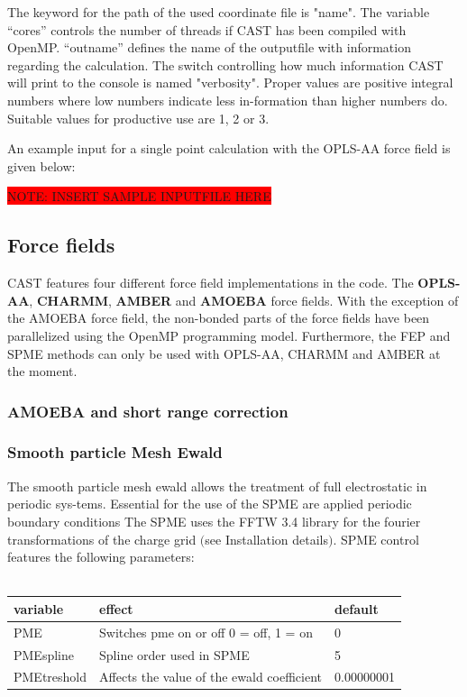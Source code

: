 \documentclass[10pt,a4paper]{article} %
\newif\ifdevmode %
\begin{document}
{	The keyword for the path of the used coordinate file is "name". The variable “cores” controls the number of threads if CAST has been compiled with OpenMP\supercite{openmp08}. “outname” defines the name of the outputfile with information regarding the calculation.
	The switch controlling how much information CAST will print to the console is named "verbosity". Proper values are positive integral numbers where low numbers indicate less in-formation than higher numbers do. Suitable values for productive use are 1, 2 or 3.



	 An example input for a single point calculation with the OPLS-AA force field is given below:

	\colorbox{red}{NOTE: INSERT SAMPLE INPUTFILE HERE}


	\subsection{Force fields}
	CAST features four different force field implementations in the code. The \textbf{OPLS-AA}\supercite{oplsaa, oplsaa2}, \textbf{CHARMM}\supercite{charmm}, \textbf{AMBER}\supercite{amber} and \textbf{AMOEBA}\supercite{amoeba} force fields. With the exception of the AMOEBA force field, the non-bonded parts of the force fields have been parallelized using the OpenMP programming model. Furthermore, the FEP and SPME methods can only be used with OPLS-AA, CHARMM and AMBER at the moment.
		\subsubsection{AMOEBA and short range correction}
		\ifdevmode \colorbox{red}{Blalala yaddayaddayadda… insert stuff here.} \fi
		\subsubsection{Smooth particle Mesh Ewald}
		The smooth particle mesh ewald\supercite{spme} allows the treatment of full electrostatic in periodic sys-tems. Essential for the use of the SPME are applied periodic boundary conditions The SPME uses the FFTW 3.4 library for the fourier transformations of the charge grid $($see Installation details$)$.  SPME control features the following parameters:\\~\\

		\begin{tabularx}{\textwidth}{l|l|l}
			variable & effect & default \\
			\hline
			PME & Switches pme on or off 0 = off, 1 = on & 0 \\
			PMEspline & Spline order used in SPME & 5 \\
			PMEtreshold & Affects the value of the ewald coefficient & 0.00000001 \\
		\end{tabularx}

}
\end{document}
